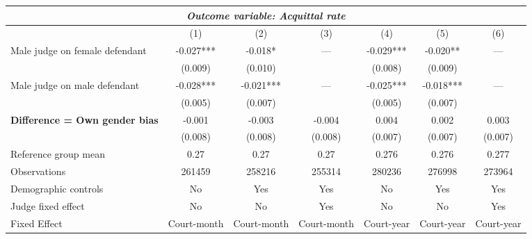 {
\def\sym#1{\ifmmode^{#1}\else\(^{#1}\)\fi}
\begin{tabular}{l*{6}{c}}
  \hline\hline
\multicolumn{7}{c}{\textit{Outcome variable: Acquittal rate}}\\
\hline
&\multicolumn{1}{c}{(1)}&\multicolumn{1}{c}{(2)}&\multicolumn{1}{c}{(3)}&\multicolumn{1}{c}{(4)}&\multicolumn{1}{c}{(5)}&\multicolumn{1}{c}{(6)}\\
\hline
Male judge on female defendant \hspace{15mm} & -0.027*** & -0.018* & --- & -0.029*** & -0.020** & --- \\
& (0.009) & (0.010) &  & (0.008) &(0.009) &  \\
Male judge on male defendant \hspace{15mm} & -0.028*** & -0.021*** & ---& -0.025*** & -0.018*** & --- \\
& (0.005) & (0.007) &  & (0.005) & (0.007) &  \\
\textbf{Difference = Own gender bias} \hspace{15mm} & -0.001 & -0.003 & -0.004 & 0.004 & 0.002 & 0.003 \\
& (0.008) & (0.008) & (0.008) & (0.007) & (0.007) & (0.007) \\
\hline
Reference group mean & 0.27 & 0.27 & 0.27 & 0.276 & 0.276 & 0.277 \\
Observations & 261459 & 258216 & 255314 & 280236 & 276998 & 273964 \\
Demographic controls & No & Yes & Yes & No & Yes & Yes \\
Judge fixed effect & No & No & Yes & No & No & Yes \\
Fixed Effect & Court-month & Court-month & Court-month & Court-year & Court-year & Court-year \\
\hline\hline
\end{tabular}
}
 
